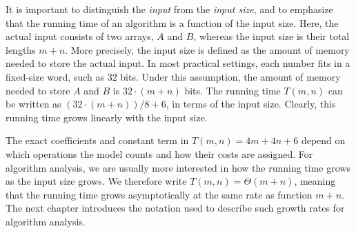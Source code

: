 It is important to distinguish the \emph{input} from the \emph{input size},
and to emphasize that the running time of an algorithm is a function of the input size.
Here, the actual input consists of two arrays, $A$ and $B$, whereas the
input size is their total lengths $m+n$. 
More precisely, the input size is defined as the amount of memory needed to
store the actual input. In most practical settings,
each number fits in a fixed-size word, such as 32 bits.
Under this assumption, the amount of memory needed to store $A$ and
$B$ is $32\cdot (m+n)$ bits. The running time $T(m, n)$ can be written
as $(32\cdot(m+n)) / 8 + 6$, in terms of the input size.
Clearly, this running time grows linearly with the input size.

The exact coefficients and constant term in $T(m,n)=4m+4n+6$ depend on which
operations the model counts and how their costs are assigned. For algorithm
analysis, we are usually more interested in how the running time grows as the
input size grows. We therefore write $T(m,n)=\Theta(m+n)$, meaning that the
running time grows asymptotically at the same rate as function $m+n$. The next chapter
introduces the notation used to describe such growth rates for algorithm analysis.

